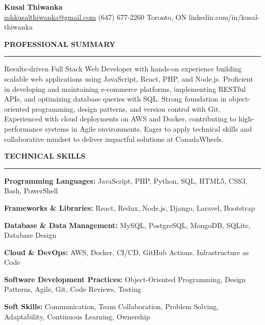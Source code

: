 \documentclass[10pt,letterpaper]{article}
\begin{document}
\begin{center}
{\LARGE\textbf{Kusal Thiwanka}}\\[3pt]
\href{mailto:mhkusalthiwanka@gmail.com}{mhkusalthiwanka@gmail.com}\hspace{2em}%
(647) 677{-}2260\hspace{2em}%
Toronto, ON\hspace{2em}
linkedin.com/in/kusal-thiwanka
\end{center}

\vspace{6pt}

\textbf{PROFESSIONAL SUMMARY}\\[-8pt]
\noindent\rule{\textwidth}{1pt}

\vspace{-2pt}

Results-driven Full Stack Web Developer with hands-on experience building scalable web applications using JavaScript, React, PHP, and Node.js. Proficient in developing and maintaining e-commerce platforms, implementing RESTful APIs, and optimizing database queries with SQL. Strong foundation in object-oriented programming, design patterns, and version control with Git. Experienced with cloud deployments on AWS and Docker, contributing to high-performance systems in Agile environments. Eager to apply technical skills and collaborative mindset to deliver impactful solutions at CanadaWheels.

\vspace{8pt}

\textbf{TECHNICAL SKILLS}\\[-8pt]
\noindent\rule{\textwidth}{1pt}

\vspace{-2pt}

\textbf{Programming Languages:} JavaScript, PHP, Python, SQL, HTML5, CSS3, Bash, PowerShell

\textbf{Frameworks \& Libraries:} React, Redux, Node.js, Django, Laravel, Bootstrap

\textbf{Database \& Data Management:} MySQL, PostgreSQL, MongoDB, SQLite, Database Design

\textbf{Cloud \& DevOps:} AWS, Docker, CI/CD, GitHub Actions, Infrastructure as Code

\textbf{Software Development Practices:} Object-Oriented Programming, Design Patterns, Agile, Git, Code Reviews, Testing

\textbf{Soft Skills:} Communication, Team Collaboration, Problem Solving, Adaptability, Continuous Learning, Ownership
\end{document}
